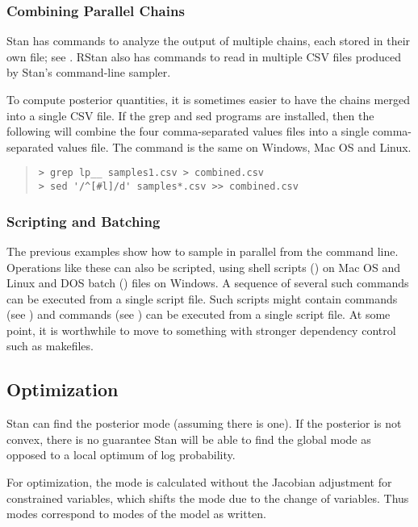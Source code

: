 \subsubsection{Combining Parallel Chains}

Stan has commands to analyze the output of multiple chains, each
stored in their own file;  see .  RStan also
has commands to read in multiple CSV files produced by Stan's
command-line sampler.  

To compute posterior quantities, it is sometimes easier to have the
chains merged into a single CSV file.  If the grep and sed programs
are installed, then the following will combine the four
comma-separated values files into a single comma-separated values
file.  The command is the same on Windows, Mac OS and Linux.
%
\begin{quote}
\begin{Verbatim}[fontshape=sl]
> grep lp__ samples1.csv > combined.csv
> sed '/^[#l]/d' samples*.csv >> combined.csv 
\end{Verbatim}
\end{quote}

\subsubsection{Scripting and Batching}

The previous examples show how to sample in parallel from the command
line.  Operations like these can also be scripted, using shell scripts
() on Mac OS and Linux and DOS batch () files on
Windows.  A sequence of several such commands can be executed from a
single script file.  Such scripts might contain  commands
(see ) and  commands (see
) can be executed from a single script
file.  At some point, it is worthwhile to move to something with
stronger dependency control such as makefiles.


\subsection{Optimization}

Stan can find the posterior mode (assuming there is one).  If the
posterior is not convex, there is no guarantee Stan will be able to
find the global mode as opposed to a local optimum of log probability.

For optimization, the mode is calculated without the Jacobian
adjustment for constrained variables, which shifts the mode due to the
change of variables.  Thus modes correspond to modes of the model as
written.  

